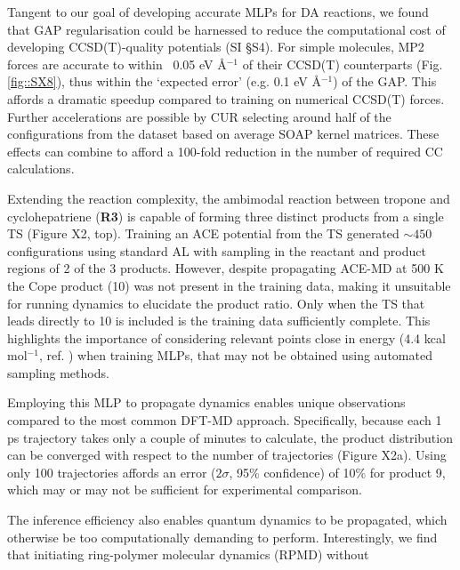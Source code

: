 \documentclass[twoside,twocolumn,9pt]{article}
\newcommand{\kcal}{kcal mol$^{-1}$}
\begin{document}
Tangent to our goal of developing accurate MLPs for DA reactions, we found that GAP regularisation could be harnessed to reduce the computational cost of developing CCSD(T)-quality potentials (SI §S4). For simple molecules, MP2 forces are accurate to within ~0.05 eV \AA${}^{-1}$ of their CCSD(T) counterparts (Fig. \ref{fig::SX8}), thus within the `expected error’ (e.g. 0.1 eV \AA${}^{-1}$) of the GAP. This affords a dramatic speedup compared to training on numerical CCSD(T) forces. Further accelerations are possible by CUR\cite{Mahoney2009} selecting around half of the configurations from the dataset based on average SOAP kernel matrices. These effects can combine to afford a 100-fold reduction in the number of required CC calculations.

Extending the reaction complexity, the ambimodal reaction between tropone and cyclohepatriene ({\bfseries{R3}}) is capable of forming three distinct products from a single TS (Figure X2, top).\cite{Jamieson2021} Training an ACE potential from the TS generated $\sim450$ configurations using standard AL with sampling in the reactant and product regions of 2 of the 3 products. However, despite propagating ACE-MD at 500 K the Cope product (10) was not present in the training data, making it unsuitable for running dynamics to elucidate the product ratio. Only when the TS that leads directly to 10 is included is the training data sufficiently complete. This highlights the importance of considering relevant points close in energy (4.4 \kcal, ref. \cite{Jamieson2021}) when training MLPs, that may not be obtained using automated sampling methods. 

Employing this MLP to propagate dynamics enables unique observations compared to the most common DFT-MD approach. Specifically, because each 1 ps trajectory takes only a couple of minutes to calculate, the product distribution can be converged with respect to the number of trajectories (Figure X2a). Using only 100 trajectories affords an error ($2\sigma$, 95\% confidence) of 10\% for product 9, which may or may not be sufficient for experimental comparison.

The inference efficiency also enables quantum dynamics to be propagated, which otherwise be too computationally demanding to perform. Interestingly, we find that initiating ring-polymer molecular dynamics (RPMD)\cite{Habershon2013} without


\end{document}
